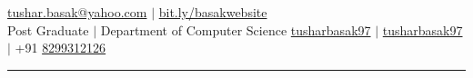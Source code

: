 \documentclass{article}
\begin{document}
\begin{flushleft}
 \hfill
{\footnotesize{}} \href{mailto:tushar.basak@yahoo.com}{tushar.basak@yahoo.com} $|$
{\footnotesize{}} \href{https://bit.ly/basakwebsite}{bit.ly/basakwebsite}
\\

\vspace{-0.35mm}
Post Graduate $|$ Department of Computer Science \hfill  
 {\footnotesize{}} \href{https://www.github.com/tusharbasak97/}{tusharbasak97} $|$ {\footnotesize{}} \href{https://www.linkedin.com/in/tusharbasak97/}{tusharbasak97} $|$  {\footnotesize{}}+91 \href{https://wa.link/owivay}{8299312126}
\\

\vspace{-0.5mm}
{\centering\hrule height 1.5pt}
\end{flushleft}
\vspace{1.8mm}
\vspace{-6.83mm}
\end{document}
